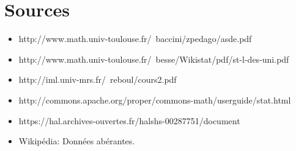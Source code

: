 		\newpage
		\section{Sources}
		\begin{itemize}
		\item http://www.math.univ-toulouse.fr/~baccini/zpedago/asde.pdf
		\item http://www.math.univ-toulouse.fr/~besse/Wikistat/pdf/st-l-des-uni.pdf
		\item http://iml.univ-mrs.fr/~reboul/cours2.pdf
		\item http://commons.apache.org/proper/commons-math/userguide/stat.html
		\item https://hal.archives-ouvertes.fr/halshs-00287751/document
		\item Wikipédia: Données abérantes.
		\end{itemize}
		
	

